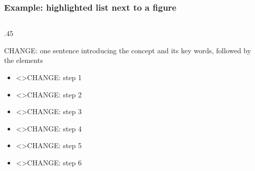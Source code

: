 
\begin{frame}
    \frametitle{Example: highlighted list next to a figure}

    \pgfmathsetmacro{}
    \pgfmathsetmacro{}
    \pgfmathsetmacro{}
    \pgfmathsetmacro{}
    \pgfmathsetmacro{}
    \pgfmathsetmacro{}

    \begin{columns}[T]
        \begin{column}{.45\textwidth}

            CHANGE: one sentence introducing the \alert{concept} and its \alert{key words}, followed by the elements

            \vspace{.5em}

            \begin{itemize}\setlength\itemsep{1em}
                \item \alert<\numberProperty>{CHANGE: step 1}
                \item \alert<\numberTarget>{CHANGE: step 2}
                \item \alert<\numberEvidenceCollectionModel>{CHANGE: step 3}
                \item \alert<\numberCertificationModel>{CHANGE: step 4}
                \item \alert<\numberExecution>{CHANGE: step 5}
                \item \alert<\numberCertificate>{CHANGE: step 6}
            \end{itemize}


\end{column}
\end{columns}
\end{frame}
